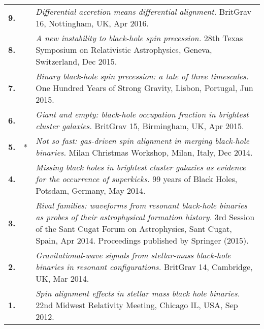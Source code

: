 \documentclass[a4paper]{moderncv}
\begin{document}
{\begin{longtable}{rp{0.4cm}p{15.8cm}}
%
\textbf{9.} & & \textit{Differential accretion means differential alignment.}
\newline{}BritGrav 16, Nottingham, UK, Apr 2016.
\vspace{0.05cm}\\
%
\textbf{8.} & & \textit{A new instability to black-hole spin precession.}
\newline{}28th Texas Symposium on Relativistic Astrophysics, Geneva, Switzerland, Dec 2015.
\vspace{0.05cm}\\
%
\textbf{7.} & & \textit{Binary black-hole spin precession: a tale of three timescales.}
\newline{} 
One Hundred Years of Strong Gravity, Lisbon, Portugal, Jun 2015.
\vspace{0.05cm}\\
%
\textbf{6.} & & \textit{Giant and empty: black-hole occupation fraction in brightest cluster galaxies.}
\newline{} 
BritGrav 15, Birmingham, UK, Apr 2015.
\vspace{0.05cm}\\
%
\textbf{5.} & * & \textit{Not so fast: gas-driven spin alignment in merging black-hole binaries.}
\newline{} 
Milan Christmas Workshop, Milan, Italy, Dec 2014.
\vspace{0.05cm}\\
%
\textbf{4.} & & \textit{Missing black holes in brightest cluster galaxies as evidence for the occurrence of superkicks.}
\newline{} 
99 years of Black Holes, Potsdam, Germany, May 2014.
\vspace{0.05cm}\\
%
\textbf{3.} & & \textit{Rival families: waveforms from resonant black-hole binaries as probes of their astrophysical formation history.}
\newline{} 
3rd Session of the Sant Cugat Forum on Astrophysics, Sant Cugat, Spain, Apr 2014.
\newline{} 
Proceedings published by Springer (2015).
\vspace{0.05cm}\\
%
\textbf{2.} & & \textit{Gravitational-wave signals from stellar-mass black-hole binaries in resonant configurations.}
\newline{} 
BritGrav 14, Cambridge, UK, Mar 2014.
\vspace{0.05cm}\\
%
\textbf{1.} & & \textit{Spin alignment effects in stellar mass black hole binaries.}
\newline{} 
22nd Midwest Relativity Meeting, Chicago IL, USA, Sep 2012.
\vspace{0.05cm}\\
\end{longtable}
}
\end{document}
